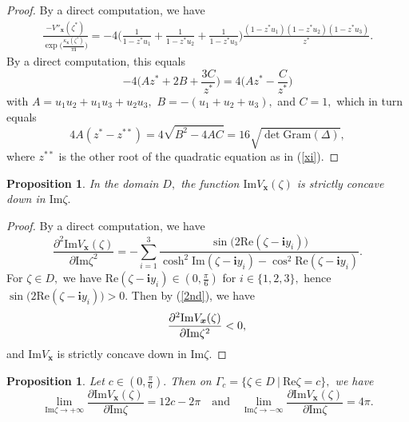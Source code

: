 \documentclass[11pt]{article}
\newtheorem{proposition}[theorem]{Proposition}
\theoremstyle{remark}
\theoremstyle{remark}
\numberwithin{equation}{section}
\begin{document}
\begin{proof}
By a direct computation, we have
\begin{equation*}
\begin{split}
\frac{-V''_{\boldsymbol x}(\zeta^*)}{\exp\big({\frac{\kappa_{\boldsymbol x}(\zeta^*)}{\pi \mathbf i}}\big)}=-4\bigg(\frac{1}{1-z^*u_1}+\frac{1}{1-z^*u_2}+\frac{1}{1-z^*u_3}\bigg)\frac{(1-z^*u_1)(1-z^*u_2)(1-z^*u_3)}{z^*}.
\end{split}
\end{equation*}
By a direct computation, this equals
$$-4\bigg(Az^*+2B+\frac{3C}{z^*}\bigg)=4\bigg(Az^*-\frac{C}{z^*}\bigg)$$
with $A=u_1u_2+u_1u_3+u_2u_3,$ $B=-(u_1+u_2+u_3),$ and $C=1,$ which in turn equals
$$4A(z^*-{z^{**}})=4\sqrt{B^2-4AC}=16\sqrt{\det\mathrm{Gram}(\Delta)},$$
where ${z^{**}}$ is the other root of the quadratic equation as in (\ref{xi}). 
\end{proof}



\begin{proposition}\label{concave}
In the domain $D,$ the function $\mathrm{Im}V_{\boldsymbol x}(\zeta)$ is strictly concave down in $\mathrm{Im}\zeta.$
\end{proposition}

\begin{proof}  By a direct computation, we have
\begin{equation}\label{2nd}
\frac{\partial ^2 \mathrm{Im}V_{\boldsymbol x}(\zeta)}{\partial \mathrm{Im}\zeta^2}
=-\sum_{i=1}^3\frac{\sin\big(2\mathrm{Re}(\zeta-\mathbf iy_i)\big)}{\cosh^2\mathrm{Im}(\zeta-\mathbf iy_i)-\cos^2\mathrm{Re}(\zeta-\mathbf iy_i)}.
\end{equation}
For  $\zeta\in D,$ we have $\mathrm{Re}(\zeta-\mathbf iy_i) \in (0,\frac{\pi}{6})$ for $i\in\{1,2,3\},$ hence $\sin\big(2\mathrm{Re}(\zeta-\mathbf iy_i)\big)>0.$ Then by (\ref{2nd}),  we have
\begin{equation*}
\frac{\partial ^2 \mathrm{Im}V_{\boldsymbol x}(\zeta)}{\partial \mathrm{Im}\zeta^2}<0,\\
\end{equation*}
and $\mathrm{Im}V_{\boldsymbol x}$ is strictly concave down in $\mathrm{Im}\zeta.$
\end{proof}








\begin{proposition} \label{limder}
Let $c\in(0,\frac{\pi}{6}).$ Then on $\Gamma_c=\Big\{\zeta\in D\ \Big|\ \mathrm{Re}\zeta =c  \Big\},$ we have 
$$\lim_{\mathrm{Im}\zeta\to +\infty}\frac{\partial \mathrm{Im}V_{\boldsymbol x}(\zeta)}{\partial \mathrm{Im}\zeta} = 12c-2\pi \quad\text{and}\quad \lim_{\mathrm{Im}\zeta\to -\infty}\frac{\partial \mathrm{Im}V_{\boldsymbol x}(\zeta)}{\partial \mathrm{Im}\zeta} = 4\pi.$$
\end{proposition}
\end{document}
